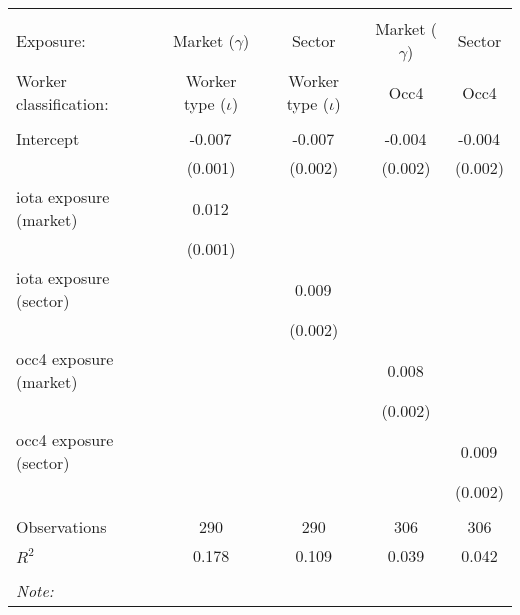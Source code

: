 \begin{tabular}{@{\extracolsep{5pt}}lcccc}
\\[-1.8ex]\hline
\hline \\[-1.8ex]
\hline \\[-1.8ex]
 Exposure: & Market ($\gamma$) & Sector & Market ($\gamma$) & Sector \\
 Worker classification: & Worker type ($\iota$) & Worker type ($\iota$) & Occ4 & Occ4 \\
 \hline &  &  &  &  \\
 Intercept & -0.007$^{}$ & -0.007$^{}$ & -0.004$^{}$ & -0.004$^{}$ \\
  & (0.001) & (0.002) & (0.002) & (0.002) \\
 iota exposure (market) & 0.012$^{}$ & & & \\
  & (0.001) & & & \\
 iota exposure (sector) & & 0.009$^{}$ & & \\
  & & (0.002) & & \\
 occ4 exposure (market) & & & 0.008$^{}$ & \\
  & & & (0.002) & \\
 occ4 exposure (sector) & & & & 0.009$^{}$ \\
  & & & & (0.002) \\
\hline \\[-1.8ex]
 Observations & 290 & 290 & 306 & 306 \\
 $R^2$ & 0.178 & 0.109 & 0.039 & 0.042 \\
\hline
\hline \\[-1.8ex]
\textit{Note:}\end{tabular}